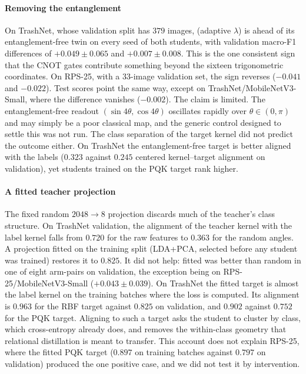 \paragraph{Removing the entanglement}
On TrashNet, whose validation split has $379$ images, \Pqk (adaptive $\lambda$) is ahead of its entanglement-free twin on every seed of both students, with validation macro-F1 differences of $+0.049\pm0.065$ and $+0.007\pm0.008$. This is the one consistent sign that the CNOT gates contribute something beyond the sixteen trigonometric coordinates.
On RPS-25, with a $33$-image validation set, the sign reverses ($-0.041$ and $-0.022$). Test scores point the same way, except on TrashNet/MobileNetV3-Small, where the difference vanishes ($-0.002$).
The claim is limited. The entanglement-free readout $(\sin4\theta,\cos4\theta)$ oscillates rapidly over $\theta\in(0,\pi)$ and may simply be a poor classical map, and the generic control designed to settle this was not run.
The class separation of the target kernel did not predict the outcome either. On TrashNet the entanglement-free target is better aligned with the labels ($0.323$ against $0.245$ centered kernel--target alignment on validation), yet students trained on the PQK target rank higher.

\paragraph{A fitted teacher projection}
The fixed random $2048\to8$ projection discards much of the teacher's class structure. On TrashNet validation, the alignment of the teacher kernel with the label kernel falls from $0.720$ for the raw features to $0.363$ for the random angles.
A projection fitted on the training split (LDA+PCA, selected before any student was trained) restores it to $0.825$. It did not help: fitted was better than random in one of eight arm-pairs on validation, the exception being \Pqk on RPS-25/MobileNetV3-Small ($+0.043\pm0.039$).
On TrashNet the fitted target is almost the label kernel on the training batches where the loss is computed. Its alignment is $0.963$ for the RBF target against $0.825$ on validation, and $0.902$ against $0.752$ for the PQK target.
Aligning to such a target asks the student to cluster by class, which cross-entropy already does, and removes the within-class geometry that relational distillation is meant to transfer.
This account does not explain RPS-25, where the fitted PQK target ($0.897$ on training batches against $0.797$ on validation) produced the one positive case, and we did not test it by intervention.

